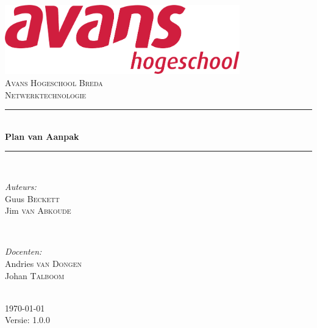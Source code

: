 \documentclass[12pt]{article}
\begin{document}
\begin{titlepage}
\newcommand{\HRule}{\rule{\linewidth}{0.5mm}} %

\center %

\includegraphics[height=3cm] {avans}\\%
\textsc{\Large Avans Hogeschool Breda}\\[0.5cm] %
\textsc{\large Netwerktechnologie}\\[0.5cm] %
\HRule \\[0.4cm]
{ \huge \bfseries Plan van Aanpak}\\[0.4cm] %
\HRule \\[1.5cm]

\begin{minipage}{0.4\textwidth}
\begin{flushleft} \large
\emph{Auteurs:}\\
Guus \textsc{Beckett} \\%
Jim \textsc{van Abkoude}
\end{flushleft}
\end{minipage}
~
\begin{minipage}{0.4\textwidth}
\begin{flushright} \large
\emph{Docenten:} \\
Andries \textsc{van Dongen} \\ %
Johan \textsc{Talboom}
\end{flushright}
\end{minipage}\\[4cm]

{\large \today}\\[3cm] %

Versie: 1.0.0

\vfill %

\end{titlepage}
\end{document}
